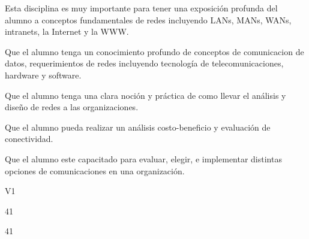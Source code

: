 \begin{syllabus}


\begin{justification}
Esta disciplina es muy importante para tener una exposición profunda del alumno a conceptos fundamentales de redes incluyendo LANs, MANs, WANs, intranets, la Internet y la WWW.
\end{justification}

\begin{goals}
\item Que el alumno tenga un conocimiento profundo de conceptos de comunicacion de datos, requerimientos de redes incluyendo tecnología de telecomunicaciones, hardware y software.
\item Que el alumno tenga una clara noción y práctica de como llevar el análisis y diseño de redes a las organizaciones.
\item Que el alumno pueda realizar un análisis costo-beneficio y evaluación de conectividad.
\item Que el alumno este capacitado para evaluar, elegir, e implementar distintas opciones de comunicaciones en una organización.
\end{goals}

\begin{outcomes}{V1}
\end{outcomes}

\begin{unit}{\LUTHREETWODef}{}{\LUTHREETWOBib}{4}{1}
   \begin{topics}
			\item \ITFIVETopicONExFIVExTWO
			\item \ITFIVETopicONExFIVExFOUR
			\item \ITFIVETopicONExFIVExSIX
   \end{topics}
	\LUTHREETWOGoal
\end{unit}

\begin{unit}{\LUTHREETHREEDef}{}{\LUTHREETHREEBib}{4}{1}
   \begin{topics}
	\item \ITONETopicONExONExONE
	\begin{subtopics}
		\item \ITONETopicONExONExONExONE
	\end{subtopics}
	\item \ITONETopicONExONExFIVE
	\item \ITFIVETopicONExFIVExONETWO
	\item \ITFIVETopicONExFIVExEIGHT
	\item \OMCONETopicTWOxONExTWO
	\item \OMCONETopicTWOxONExTHREE
	\item \OMCTHREETopicTWOxTHREExFOUR
   \end{topics}
	\LUTHREETHREEGoal
\end{unit}


\end{syllabus}
